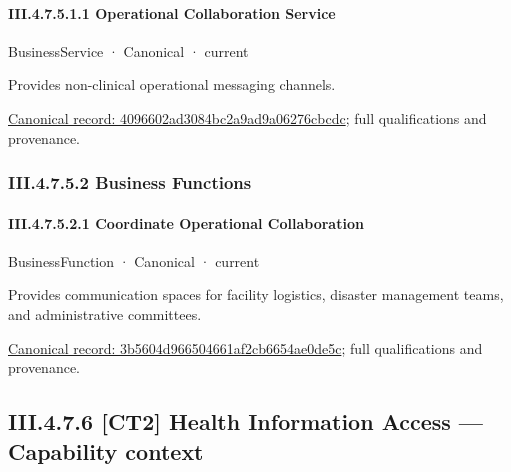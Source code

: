 \paragraph*{III.4.7.5.1.1 Operational Collaboration Service}
\label{navigation:III.4.7.5.1.1}

\label{element:4096602ad3084bc2a9ad9a06276cbcdc}
{\small BusinessService · Canonical · current}\par

Provides non-clinical operational messaging channels.


{\footnotesize \href{../../../../../../../continuum/business/business-service/4096602ad3084bc2a9ad9a06276cbcdc.md}{Canonical record: 4096602ad3084bc2a9ad9a06276cbcdc}; full qualifications and provenance.}\par
\subsubsection*{III.4.7.5.2 Business Functions}
\label{navigation:III.4.7.5.2}

\paragraph*{III.4.7.5.2.1 Coordinate Operational Collaboration}
\label{navigation:III.4.7.5.2.1}

\label{element:3b5604d966504661af2cb6654ae0de5c}
{\small BusinessFunction · Canonical · current}\par

Provides communication spaces for facility logistics, disaster management teams, and administrative committees.


{\footnotesize \href{../../../../../../../continuum/business/business-function/3b5604d966504661af2cb6654ae0de5c.md}{Canonical record: 3b5604d966504661af2cb6654ae0de5c}; full qualifications and provenance.}\par
\subsection*{III.4.7.6 [CT2] Health Information Access — Capability context}
\label{navigation:III.4.7.6}

